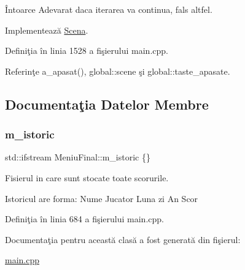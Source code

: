 \begin{DoxyReturn}{Întoarce}
Adevarat daca iterarea va continua, fals altfel. 
\end{DoxyReturn}


Implementează \hyperlink{classScena_a9e5fcc831ed410b5b2422231ede746ee}{Scena}.



Definiţia în linia 1528 a fişierului main.\+cpp.



Referinţe a\+\_\+apasat(), global\+::scene şi global\+::taste\+\_\+apasate.



\subsection{Documentaţia Datelor Membre}
\mbox{\label{classMeniuFinal_a995e013192e1bed67332f0d54ae2b482}} 
\subsubsection{\texorpdfstring{m\+\_\+istoric}{m\_istoric}}
{\footnotesize\ttfamily std\+::ifstream Meniu\+Final\+::m\+\_\+istoric \{\}\hspace{0.3cm}{\ttfamily [private]}}



Fisierul in care sunt stocate toate scorurile. 

Istoricul are forma\+: Nume Jucator Luna zi An Scor 

Definiţia în linia 684 a fişierului main.\+cpp.



Documentaţia pentru această clasă a fost generată din fişierul\+:\begin{DoxyCompactItemize}
\item 
\hyperlink{main_8cpp}{main.\+cpp}\end{DoxyCompactItemize}
